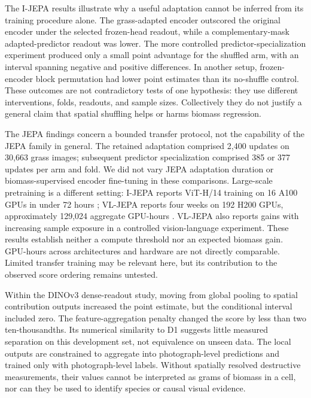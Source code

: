 \documentclass[pdflatex,a4paper,sn-nature]{sn-jnl}
\begin{document}
The I-JEPA results illustrate why a useful adaptation cannot be inferred from its training procedure alone. The grass-adapted encoder outscored the original encoder under the selected frozen-head readout, while a complementary-mask adapted-predictor readout was lower. The more controlled predictor-specialization experiment produced only a small point advantage for the shuffled arm, with an interval spanning negative and positive differences. In another setup, frozen-encoder block permutation had lower point estimates than its no-shuffle control. These outcomes are not contradictory tests of one hypothesis: they use different interventions, folds, readouts, and sample sizes. Collectively they do not justify a general claim that spatial shuffling helps or harms biomass regression.

The JEPA findings concern a bounded transfer protocol, not the capability of the JEPA family in general. The retained adaptation comprised 2,400 updates on 30,663 grass images; subsequent predictor specialization comprised 385 or 377 updates per arm and fold. We did not vary JEPA adaptation duration or biomass-supervised encoder fine-tuning in these comparisons. Large-scale pretraining is a different setting: I-JEPA reports ViT-H/14 training on 16 A100 GPUs in under 72 hours \cite{assran2023ijepa}; VL-JEPA reports four weeks on 192 H200 GPUs, approximately 129,024 aggregate GPU-hours \cite{chen2025vljepa}. VL-JEPA also reports gains with increasing sample exposure in a controlled vision-language experiment. These results establish neither a compute threshold nor an expected biomass gain. GPU-hours across architectures and hardware are not directly comparable. Limited transfer training may be relevant here, but its contribution to the observed score ordering remains untested.

Within the DINOv3 dense-readout study, moving from global pooling to spatial contribution outputs increased the point estimate, but the conditional interval included zero. The feature-aggregation penalty changed the score by less than two ten-thousandths. Its numerical similarity to D1 suggests little measured separation on this development set, not equivalence on unseen data. The local outputs are constrained to aggregate into photograph-level predictions and trained only with photograph-level labels. Without spatially resolved destructive measurements, their values cannot be interpreted as grams of biomass in a cell, nor can they be used to identify species or causal visual evidence.
\end{document}
